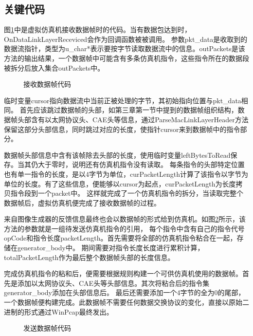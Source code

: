 \subsection{关键代码}
图\ref{codeSimRec}中是虚拟仿真机接收数据帧时的代码。当有数据包达到时，OnDataLinkLayerReceviced会作为回调函数被被调用。
参数pkt\_data是收取到的数据流指针，类型为u\_char*表示要按字节读取数据流中的信息。outPackets是该方法的输出结果，一个数据帧中可能含有多条仿真机指令，这些指令所在的数据段被拆分后放入集合outPackets中。
\begin{figure}[h!]
    \centering
     
    \caption{接收数据帧代码}
    \label{codeSimRec}
\end{figure}
\vspace{12pt}
\par
临时变量cursor指向数据流中当前正被处理的字节，其初始指向位置与pkt\_data相同。
首先应该跳过数据帧的头部，如第三章第一节中提到的数据帧组织结构，数据帧头部含有以太网协议头、CAE头等信息，通过ParseMacLinkLayerHeader方法保留这部分头部信息，同时跳过对应的长度，使指针cursor来到数据帧中的指令部分。
\par
数据帧头部信息中含有该帧除去头部的长度，使用临时变量leftBytesToRead保存。当其仍大于零时，说明还有仿真机指令没有读取。
每条指令的头部特定位置也有单一指令的长度，是以4字节为单位，curPacketLength计算了该指令以字节为单位的长度。有了这些信息，便能够以cursor为起点，curPacketLength为长度拷贝指令段到一个packet中。
这样就完成了一个仿真机指令的拆分，当读取完整个数据帧后，虚拟仿真机便完成了接收数据帧的过程。


\par
来自图像生成器的反馈信息最终也会以数据帧的形式给到仿真机。如图\ref{codeSimSend}所示，该方法的参数就是一组待发送仿真机指令的引用，
每个指令中含有自己的指令代号opCode和指令长度packetLength。首先需要将全部的仿真机指令粘合在一起，存储在generator\_body中。
期间需要对指令长度长度进行累积计算，totalPacketLength作为最后整个数据帧头部的长度信息。
\par
完成仿真机指令的粘和后，便需要根据规则构建一个可供仿真机使用的数据帧。首先是添加以太网协议头、CAE头等头部信息。其次将粘合后的指令集generator\_body添加在头部信息后。
最后还需要添加一个4字节的全为0的尾部，一个数据帧便构建完成。此数据帧不需要任何数据交换协议的变化，直接以原始二进制的形式通过WinPcap最终发出。
\begin{figure}[h!]
    \centering
     
    \caption{发送数据帧代码}
    \label{codeSimSend}
\end{figure}

